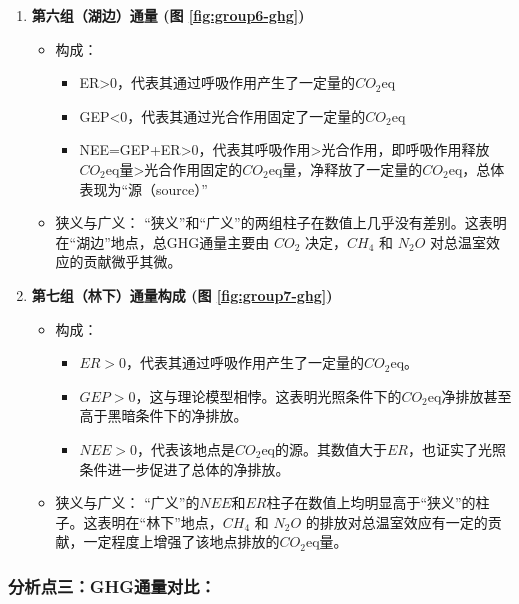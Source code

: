 \documentclass[10.5pt]{config}
\begin{document}
\begin{enumerate}
    \item \textbf{第六组（湖边）通量 (图 \ref{fig:group6-ghg})} %

    \begin{itemize}[leftmargin=*]
        \item 构成：
        \begin{itemize}
            \item ER>0，代表其通过呼吸作用产生了一定量的$CO_2\text{eq}$
            \item GEP<0，代表其通过光合作用固定了一定量的$CO_2\text{eq}$
            \item NEE=GEP+ER>0，代表其呼吸作用>光合作用，即呼吸作用释放$CO_2\text{eq}$量>光合作用固定的$CO_2\text{eq}$量，净释放了一定量的$CO_2\text{eq}$，总体表现为“源（source）”
        \end{itemize}
        \item 狭义与广义：
        “狭义”和“广义”的两组柱子在数值上几乎没有差别。这表明在“湖边”地点，总GHG通量主要由 $CO_2$ 决定，$CH_4$ 和 $N_2O$ 对总温室效应的贡献微乎其微。
    \end{itemize}

    \item \textbf{第七组（林下）通量构成 (图 \ref{fig:group7-ghg})} %

    \begin{itemize}[leftmargin=*]
        \item 构成：
        \begin{itemize}
            \item $ER>0$，代表其通过呼吸作用产生了一定量的$CO_2\text{eq}$。
            \item $GEP>0$，这与理论模型相悖。这表明光照条件下的$CO_2\text{eq}$净排放甚至高于黑暗条件下的净排放。
            \item $NEE>0$，代表该地点是$CO_2\text{eq}$的源。其数值大于$ER$，也证实了光照条件进一步促进了总体的净排放。
        \end{itemize}
        \item 狭义与广义：
        “广义”的$NEE$和$ER$柱子在数值上均明显高于“狭义”的柱子。这表明在“林下”地点，$CH_4$ 和 $N_2O$ 的排放对总温室效应有一定的贡献，一定程度上增强了该地点排放的$CO_2\text{eq}$量。
    \end{itemize}

\end{enumerate}

\subsubsection*{\textbf{分析点三：GHG通量对比：}}
\end{document}
